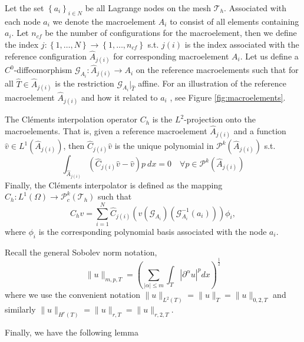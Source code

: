 Let the set  $\left\{ a_{i}\right\}_{i\in N}$ be all Lagrange nodes on the mesh $\mathcal{T}_{h}$. Associated with each node $a_{i}$ we denote the macroelement $A_{i}$ to consist of all elements containing $a_{i}$. Let $n_{cf}$ be the number of configurations for the macroelement, then we define the index $j:
\left\{ 1,\ldots,N \right\} \to \left\{ 1, \ldots, n_{cf} \right\}  $ s.t. $j( i) $ is the index associated with the reference configuration $\widehat{A}_{j(i) }$ for corresponding macroelement $A_{i}$.
Let us define a $C^{0}$-diffeomorphism $\mathcal{G}_{A_{i}}:
\widehat{A}_{j( i) } \to A_{i}$ on the reference macroelements such that for all $\hat{T} \in \widehat{A}_{j( i) } $ is the restriction $\mathcal{G} _{A_{i}}|_{ \hat{T} }$ affine. For an illustration of the reference
macroelement $\widehat{A}_{j( i) }$ and how it related to $a_{i}$ , see
Figure \ref{fig:macroelements}.

The Cléments interpolation operator $C_{h}$ is the $L^2$-projection onto the macroelements. That is, given
a reference macroelement $\widehat{A}_{j( i) }$ and a function $\hat{v} \in L^{1}( \widehat{A}_{j( i) })  $, then $\widehat{C}_{j( i) } \hat{v}$  is the unique polynomial in $\mathcal{P}^{k} ( \widehat{A}_{j( i) })  $ s.t. \[
\int_{  \widehat{A}_{j( i) }}^{} ( \widehat{C}_{j( i) } \hat{v} - \hat{v}) p \ dx  = 0 \quad  \forall p \in \mathcal{P}^{k} ( \widehat{A}_{j( i) })
\]
Finally, the Cléments interpolator is defined as the mapping $C_{h} : L^{1}( \Omega )  \to \mathcal{P} ^{k}_{c}(\mathcal{T}_{h}   ) $ such that
\[
C_{h} v = \sum_{i=1}^{N} \widehat{C}_{j( i) } ( v (\mathcal{G} _{A_{i}}) (\mathcal{G}^{-1}_{A_{i}}(a_{i})) )\phi _{i},
\]
where $\phi _{i}$ is the corresponding polynomial basis associated with the node $a_{i}$.

Recall the general Sobolev norm notation,
\[
\| u \|_{ m,p,T }^{  } = \left( \sum_{ \left\lvert \alpha  \right\rvert \le m}^{} \int_{T}^{}  \left\lvert  \partial ^{\alpha } u \right\rvert^{p} dx   \right)^{\frac{1}{2}}
\]
where we use the convenient notation $\| u \|_{L^2(T) }^{  } = \| u \|_{ T  }^{  } = \| u \|_{ 0,2,T  }^{  } $ and similarly $\| u \|_{ H^r( T )  }^{  } = \| u \|_{ r,T  }^{  } = \| u \|_{ r,2,T  }^{  }  $.


Finally, we have the following lemma

